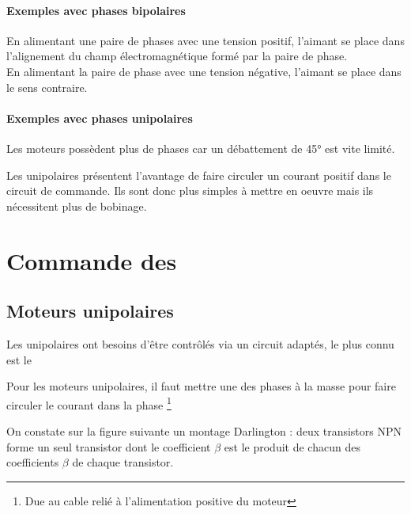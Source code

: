 \subsubsection{Exemples avec phases bipolaires}

En alimentant une paire de phases avec une tension positif, l'aimant se place dans l'alignement du champ électromagnétique 
formé par la paire de phase.\\
En alimentant la paire de phase avec une tension négative, l'aimant se place dans le sens contraire.\\



\subsubsection{Exemples avec phases unipolaires}


Les moteurs possèdent plus de phases car un débattement de 45° est vite limité.

Les \pap unipolaires présentent l'avantage de faire circuler un courant positif dans le circuit de commande. 
Ils sont donc plus simples à mettre en oeuvre mais ils nécessitent plus de bobinage.

\chapter{Commande des \paps}

\section{Moteurs unipolaires}
Les \pap unipolaires ont besoins d'être contrôlés via un circuit adaptés, le plus connu est le 



Pour les moteurs unipolaires, il faut mettre une des phases à la masse pour faire circuler le courant dans la phase \footnote{Due au cable relié à l'alimentation positive du moteur}

On constate sur la figure suivante un montage Darlington : deux transistors NPN forme un seul transistor dont le coefficient
$\beta$ est le produit de chacun des coefficients $\beta$ de chaque transistor.

